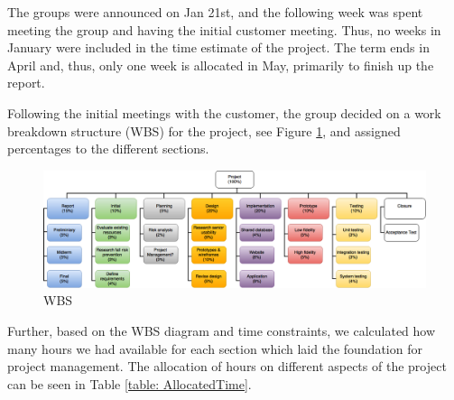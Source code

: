 The groups were announced on Jan 21st, and the following week was spent meeting the group and having the initial customer meeting. Thus, no weeks in January were included in the time estimate of the project.
The term ends in April and, thus, only one week is allocated in May, primarily to finish up the report.

Following the initial meetings with the customer, the group decided on a work breakdown structure (WBS) for the project, see Figure \ref{fig:WBS}, and assigned percentages to the different sections. 
 
\begin{figure}[H]
\centering
\includegraphics[scale=0.4]{Figures/WBS.png}
\caption{WBS}
\label{fig:WBS}
\end{figure}

Further, based on the WBS diagram and time constraints, we calculated how many hours we had available for each section which laid the foundation for project management. The allocation of hours on different aspects of the project can be seen in Table \ref{table: AllocatedTime}. 

